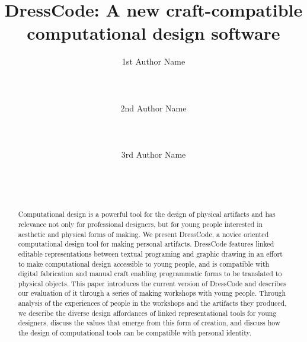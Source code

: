 \documentclass{sigchi}
\begin{document}
\title{DressCode: A new craft-compatible computational design software}

\author{
 \alignauthor 1st Author Name\\
 \\
 \\
 \\
 \alignauthor 2nd Author Name\\
 \\
 \\
 \\
 \alignauthor 3rd Author Name\\
 \\
 \\
 \\
}

\maketitle

\begin{abstract}
Computational design is a powerful tool for the design of physical artifacts and has relevance not only for professional designers, but for young people interested in aesthetic and physical forms of making. We present DressCode, a novice oriented computational design tool for making personal artifacts. DressCode features linked editable representations between textual programing and graphic drawing in an effort to make computational design accessible to young people, and is compatible with digital fabrication and manual craft enabling programmatic forms to be translated to physical objects. This paper introduces the current version of DressCode and describes our evaluation of it through a series of making workshops with young people. Through analysis of the experiences of people in the workshops and the artifacts they produced, we describe the diverse design affordances of linked representational tools for young designers, discuss the values that emerge from this form of creation, and discuss how the design of computational tools can be compatible with personal identity.
\end{abstract}


\end{document}

